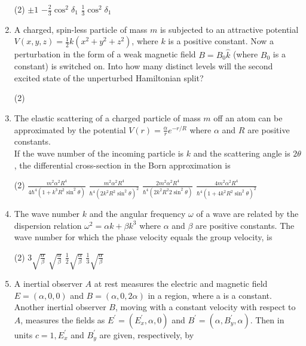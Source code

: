 \begin{enumerate}
 \begin{tasks}(2)
	\task[\textbf{b.}] $\pm 1$
	\task[\textbf{c.}]$-\frac{2}{3} \cos ^{2} \delta_{1}$
	\task[\textbf{d.}]  $\frac{1}{3} \cos ^{2} \delta_{1}$
\end{tasks}
\item A charged, spin-less particle of mass $m$ is subjected to an attractive potential $V(x, y, z)=\frac{1}{2} k\left(x^{2}+y^{2}+z^{2}\right)$, where $k$ is a positive constant. Now a perturbation in the form of a weak magnetic field $B=B_{0} \hat{k}$ (where $B_{0}$ is a constant) is switched on. Into how many distinct levels will the second excited state of the unperturbed Hamiltonian split?
 \begin{tasks}(2)
\end{tasks}
\item  The elastic scattering of a charged particle of mass $m$ off an atom can be approximated by the potential $V(r)=\frac{\alpha}{r} e^{-r / R}$ where $\alpha$ and $R$ are positive constants.\\
If the wave number of the incoming particle is $k$ and the scattering angle is $2 \theta$, the differential cross-section in the Born approximation is
 \begin{tasks}(2)
	\task[\textbf{a.}]$\frac{m^{2} \alpha^{2} R^{4}}{4 \hbar^{4}\left(1+k^{3} R^{2} \sin ^{2} \theta\right)}$
	\task[\textbf{b.}]$\frac{m^{2} \alpha^{2} R^{4}}{\hbar^{4}\left(2 k^{2} R^{2} \sin ^{2} \theta\right)^{2}}$
	\task[\textbf{c.}] $\frac{2 m^{2} \alpha^{2} R^{4}}{\hbar^{4}\left(2 k^{2} R^{2} 2 \sin ^{2} \theta\right)}$
	\task[\textbf{d.}] $\frac{4 m^{2} \alpha^{2} R^{4}}{\hbar^{4}\left(1+4 k^{2} R^{2} \sin ^{2} \theta\right)^{2}}$
\end{tasks}
\item  The wave number $k$ and the angular frequency $\omega$ of a wave are related by the dispersion relation $\omega^{2}=\alpha k+\beta k^{3}$ where $\alpha$ and $\beta$ are positive constants. The wave number for which the phase velocity equals the group velocity, is
 \begin{tasks}(2)
	\task[\textbf{a.}]$3 \sqrt{\frac{\alpha}{\beta}}$
	\task[\textbf{b.}]$\sqrt{\frac{\alpha}{\beta}}$
	\task[\textbf{c.}]$\frac{1}{2} \sqrt{\frac{\alpha}{\beta}}$
	\task[\textbf{d.}] $\frac{1}{3} \sqrt{\frac{\alpha}{\beta}}$
\end{tasks}
\item  A inertial observer $A$ at rest measures the electric and magnetic field $E=(\alpha, 0,0)$ and $B=(\alpha, 0,2 \alpha)$ in a region, where a is a constant. Another inertial observer $B$, moving with a constant velocity with respect to $A$, measures the fields as $E^{\prime}=\left(E_{x}^{\prime}, \alpha, 0\right)$ and $B^{\prime}=\left(\alpha, B_{y}^{\prime}, \alpha\right)$. Then in units $c=1, E_{x}^{\prime}$ and $B_{y}^{\prime}$ are given, respectively, by

\end{enumerate}

